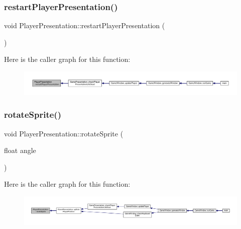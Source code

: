 \subsubsection{\texorpdfstring{restart\+Player\+Presentation()}{restartPlayerPresentation()}}
{\footnotesize\ttfamily void Player\+Presentation\+::restart\+Player\+Presentation (\begin{DoxyParamCaption}{ }\end{DoxyParamCaption})}

Here is the caller graph for this function\+:
\nopagebreak
\begin{figure}[H]
\begin{center}
\leavevmode
\includegraphics[width=350pt]{class_player_presentation_ae4bf63751b63f582902d4ea31e06a486_icgraph}
\end{center}
\end{figure}
\mbox{\label{class_player_presentation_af938e83bf3a90263076411e0935731bd}} 
\subsubsection{\texorpdfstring{rotate\+Sprite()}{rotateSprite()}}
{\footnotesize\ttfamily void Player\+Presentation\+::rotate\+Sprite (\begin{DoxyParamCaption}\item[{float}]{angle }\end{DoxyParamCaption})}

Here is the caller graph for this function\+:
\nopagebreak
\begin{figure}[H]
\begin{center}
\leavevmode
\includegraphics[width=350pt]{class_player_presentation_af938e83bf3a90263076411e0935731bd_icgraph}
\end{center}
\end{figure}
\mbox{\label{class_player_presentation_aef6ba74848a34fb93528062bda98059e}} 
